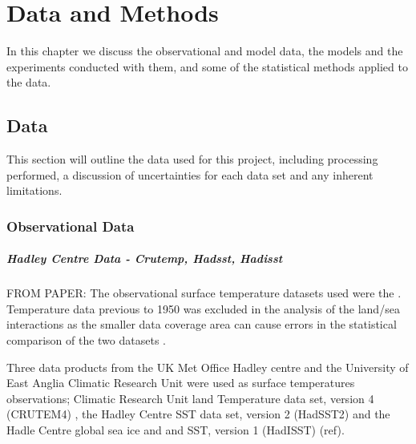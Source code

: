 \chapter{Data and Methods} %

\label{methods} %


In this chapter we discuss the observational and model data, the models and the 
experiments conducted with them, and some of the statistical methods applied to 
the data.


\section{Data}

This section will outline the data used for this project, including processing 
performed, a discussion of uncertainties for each data set and any inherent 
limitations.

\subsection{Observational Data}

\paragraph{Hadley Centre Data - Crutemp, Hadsst, Hadisst}
FROM PAPER: The observational surface temperature datasets used were the .  
Temperature data previous to 1950 was excluded in the analysis of the land/sea 
interactions as the smaller data coverage area can cause errors in the 
statistical comparison of the two datasets \citep{Dommenget2009}.

Three data products from the UK Met Office Hadley centre and the University of 
East Anglia Climatic Research Unit were used as surface temperatures 
observations; Climatic Research Unit land Temperature data set, version 
4 (CRUTEM4) \citep{Brohan2006}, the Hadley Centre SST data set,
version 2 (HadSST2) \citep{Rayner2006} and the Hadle Centre global sea ice and 
and SST, version 1 (HadISST) (ref).

